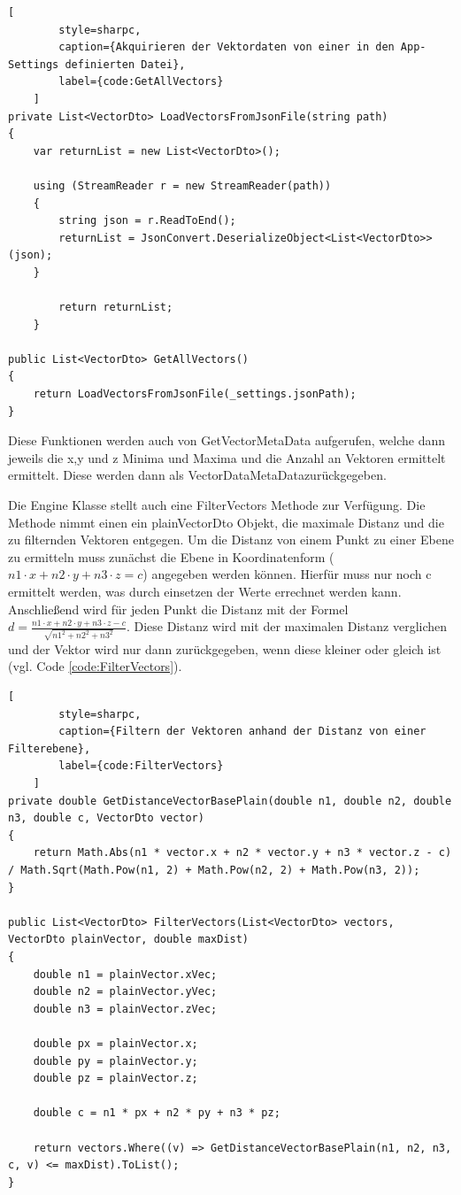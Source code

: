 \begin{codeblock}
	\begin{lstlisting}[
		style=sharpc,
		caption={Akquirieren der Vektordaten von einer in den App-Settings definierten Datei},
		label={code:GetAllVectors}
	]
private List<VectorDto> LoadVectorsFromJsonFile(string path)
{
	var returnList = new List<VectorDto>();

	using (StreamReader r = new StreamReader(path))
	{
		string json = r.ReadToEnd();
		returnList = JsonConvert.DeserializeObject<List<VectorDto>>(json);
	}

		return returnList;
	}

public List<VectorDto> GetAllVectors()
{
	return LoadVectorsFromJsonFile(_settings.jsonPath);
}
	\end{lstlisting}
\end{codeblock}

Diese Funktionen werden auch von \grqq GetVectorMetaData\grqq\space
aufgerufen, welche dann jeweils die x,y und z Minima und Maxima und
die Anzahl an Vektoren ermittelt ermittelt. Diese werden dann als
\grqq VectorDataMetaData\grqq\space zurückgegeben.

Die Engine Klasse stellt auch eine FilterVectors Methode zur Verfügung.
Die Methode nimmt einen ein plainVectorDto Objekt, die maximale Distanz
und die zu filternden Vektoren entgegen. Um die Distanz von einem Punkt
zu einer Ebene zu ermitteln muss zunächst die Ebene in Koordinatenform
($n1 \cdot x + n2 \cdot y + n3 \cdot z = c$) angegeben werden können.
Hierfür muss nur noch c ermittelt werden, was durch einsetzen der Werte
errechnet werden kann. Anschließend wird für jeden Punkt die Distanz
mit der Formel $d = \frac{n1 \cdot x + n2 \cdot y + n3 \cdot z - c}{\sqrt{n1^2 + n2^2 + n3^2}}$.
Diese Distanz wird mit der maximalen Distanz verglichen und der Vektor
wird nur dann zurückgegeben, wenn diese kleiner oder gleich ist
(vgl. Code \ref{code:FilterVectors}).

\begin{codeblock}
	\begin{lstlisting}[
		style=sharpc,
		caption={Filtern der Vektoren anhand der Distanz von einer Filterebene},
		label={code:FilterVectors}
	]
private double GetDistanceVectorBasePlain(double n1, double n2, double n3, double c, VectorDto vector)
{
	return Math.Abs(n1 * vector.x + n2 * vector.y + n3 * vector.z - c) / Math.Sqrt(Math.Pow(n1, 2) + Math.Pow(n2, 2) + Math.Pow(n3, 2));
}

public List<VectorDto> FilterVectors(List<VectorDto> vectors, VectorDto plainVector, double maxDist)
{
	double n1 = plainVector.xVec;
	double n2 = plainVector.yVec;
	double n3 = plainVector.zVec;

	double px = plainVector.x;
	double py = plainVector.y;
	double pz = plainVector.z;

	double c = n1 * px + n2 * py + n3 * pz;

	return vectors.Where((v) => GetDistanceVectorBasePlain(n1, n2, n3, c, v) <= maxDist).ToList();
}
	\end{lstlisting}
\end{codeblock}

